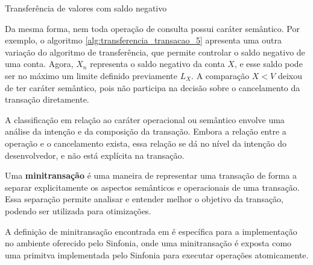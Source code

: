 \documentclass[11pt,twoside,a4paper]{book}
\begin{document}
\begin{algorithm}
\caption{Transferência de valores com saldo negativo}
\label{alg:transferencia_transacao_5}
\end{algorithm}

Da mesma forma, nem toda operação de consulta possui caráter semântico. Por exemplo, o algoritmo \ref{alg:transferencia_transacao_5} apresenta uma outra variação do algoritmo de transferência, que permite controlar o saldo negativo de uma conta. Agora, $X_n$ representa o saldo negativo da conta $X$, e esse saldo pode ser no máximo um limite definido previamente $L_X$. A comparação $X < V$ deixou de ter caráter semântico, pois não participa na decisão sobre o cancelamento da transação diretamente.

A classificação em relação ao caráter operacional ou semântico envolve uma análise da intenção e da composição da transação. Embora a relação entre a operação e o cancelamento exista, essa relação se dá no nível da intenção do desenvolvedor, e não está explícita na transação.

Uma \textbf{minitransação} é uma maneira de representar uma transação de forma a separar explicitamente os aspectos semânticos e operacionais de uma transação. Essa separação permite analisar e entender melhor o objetivo da transação, podendo ser utilizada para otimizações.

A definição de minitransação encontrada em \cite{sinfonia} é específica para a implementação no ambiente oferecido pelo Sinfonia, onde uma minitransação é exposta como uma primitva implementada pelo Sinfonia para executar operações atomicamente.


\end{document}
